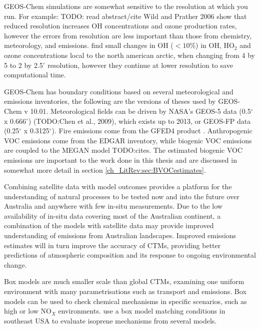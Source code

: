     GEOS-Chem simulations are somewhat sensitive to the resolution at which you run.
    For example: TODO: read abstract/cite Wild and Prather 2006 show that reduced resolution increases OH concentrations and ozone production  rates, however the errors from resolution are less important than those from chemistry, meteorology, and emissions. 
    \cite{Christian2017} find small changes in OH ($<10$\%) in OH, HO$_2$ and ozone concentrations local to the north american arctic, when changing from 4 by 5 to 2 by 2.5$^{\circ}$ resolution, however they continue at lower resolution to save computational time.
    
    GEOS-Chem has boundary conditions based on several meteorological and emissions inventories, the following are the versions of theses used by GEOS-Chem v 10.01. 
    Meteorological fields can be driven by NASA's GEOS-5 data (0.5$^{\circ}$ x 0.666$^{\circ}$) (TODO:Chen et al., 2009), which exists up to 2013, or GEOS-FP data (0.25$^{\circ}$ x 0.3125$^{\circ}$).
    Fire emissions come from the GFED4 product \citep{Giglio2013}. 
    Anthropogenic VOC emissions come from the EDGAR inventory, while biogenic VOC emissions are coupled to the MEGAN model TODO:cites.
    The estimated biogenic VOC emissions are important to the work done in this thesis and are discussed in somewhat more detail in section \ref{ch_LitRev:sec:BVOCestimates}.

    Combining satellite data with model outcomes provides a platform for the understanding of natural processes to be tested now and into the future over Australia and anywhere with few in-situ measurements.
    Due to the low availability of in-situ data covering most of the Australian continent, a combination of the models with satellite data may provide improved understanding of emissions from Australian landscapes.
    Improved emissions estimates will in turn improve the accuracy of CTMs, providing better predictions of atmospheric composition and its response to ongoing environmental change.
    
    Box models are much smaller scale than global CTMs, examining one uniform environment with many parametrisations such as transport and emissions.
    Box models can be used to check chemical mechanisms in specific scenarios, such as high or low NO$_X$ environments.
    \cite{Marvin2017} use a box model matching conditions in southeast USA to evaluate isoprene mechanisms from several models.
    
  
